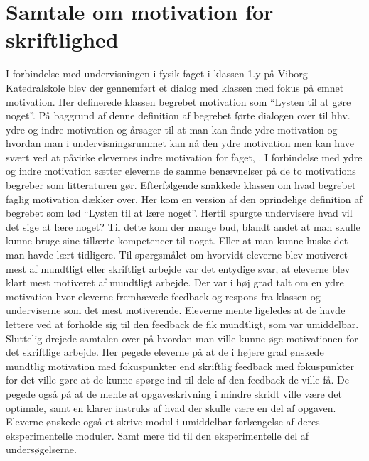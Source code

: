 \section{Samtale om motivation for skriftlighed}
\label{sec:sam}
I forbindelse med undervisningen i fysik faget i klassen 1.y på Viborg Katedralskole blev der gennemført et dialog med klassen med fokus på emnet motivation. Her definerede klassen begrebet motivation som ``Lysten til at gøre noget''. På baggrund af denne definition af begrebet førte dialogen over til hhv. ydre og indre motivation og årsager til at man kan finde ydre motivation og hvordan man i undervisningsrummet kan nå den ydre motivation men kan have svært ved at påvirke elevernes indre motivation for faget, \citep{Buhl2010}. I forbindelse med ydre og indre motivation sætter eleverne de samme benævnelser på de to motivations begreber som litteraturen gør. Efterfølgende snakkede klassen om hvad begrebet faglig motivation dækker over. Her kom en version af den oprindelige definition af begrebet som lød ``Lysten til at lære noget''. Hertil spurgte undervisere hvad vil det sige at lære noget? Til dette kom der mange bud, blandt andet at man skulle kunne bruge sine tillærte kompetencer til noget. Eller at man kunne huske det man havde lært tidligere. Til spørgsmålet om hvorvidt eleverne blev motiveret mest af mundtligt eller skriftligt arbejde var det entydige svar, at eleverne blev klart mest motiveret af mundtligt arbejde. Der var i høj grad talt om en ydre motivation hvor eleverne fremhævede feedback og respons fra klassen og underviserne som det mest motiverende. Eleverne mente ligeledes at de havde lettere ved at forholde sig til den feedback de fik mundtligt, som var umiddelbar. Sluttelig drejede samtalen over på hvordan man ville kunne øge motivationen for det skriftlige arbejde. Her pegede eleverne på at de i højere grad ønskede mundtlig motivation med fokuspunkter end skriftlig feedback med fokuspunkter for det ville gøre at de kunne spørge ind til dele af den feedback de ville få. De pegede også på at de mente at opgaveskrivning i mindre skridt ville være det optimale, samt en klarer instruks af hvad der skulle være en del af opgaven. Eleverne ønskede også et skrive modul i umiddelbar forlængelse af deres eksperimentelle moduler. Samt mere tid til den eksperimentelle del af undersøgelserne.

